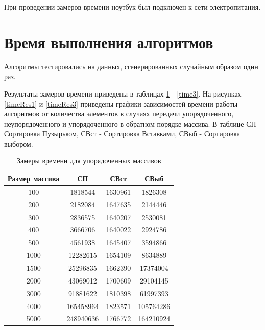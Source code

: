 \documentclass[12pt]{report}
\begin{document}
При проведении замеров времени ноутбук был подключен к сети электропитания.

\section{Время выполнения алгоритмов}
Алгоритмы тестировались на данных, сгенерированных случайным образом один раз.

Результаты замеров времени приведены в таблицах \ref{time1} - \ref{time3}. На рисунках \ref{timeRes1} и \ref{timeRes3} приведены графики зависимостей времени работы алгоритмов от количества элементов в случаях передачи упорядоченного, неупорядоченного и упорядоченного в обратном порядке массива. В таблице СП - Сортировка Пузырьком, СВст - Сортировка Вставками, СВыб - Сортировка выбором.

\newpage
\begin{table}[h]
	\begin{center}
		\caption{\label{time1} Замеры времени для упорядоченных массивов}
		\begin{tabular}{|c c c c|} 
 			\hline
			Размер массива & СП & СВст & СВыб \\ [0.5ex] 
 			\hline\hline
 			100 & 1818544 & 1630961 & 1826308\\
 			\hline
 			200 & 2182084 & 1647635 & 2144446 \\
 			\hline
			300 & 2836575 & 1640207 & 2530081\\
			\hline
			400 & 3666706 & 1640022 & 2924786\\
			\hline
			500 & 4561938 & 1645407 & 3594866\\
			\hline
			1000 & 12282615 & 1654109 & 8634889\\
			\hline
			1500 & 25296835 & 1662390 & 17374004\\
			\hline
			2000 & 43069012 & 1700609 & 29104145\\
			\hline
			3000 & 91881622 & 1810398 & 61997393\\
			\hline
			4000 & 165458964 & 1823571 & 105764286\\
			\hline
			5000 & 248940636 & 1766772 & 164210924\\
			\hline
			\end{tabular}
	\end{center}
\end{table}

\newpage
\end{document}
